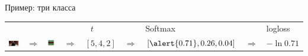 \documentclass[notes,12pt, aspectratio=169]{beamer}
\begin{document}
\begin{frame}{Пример: три класса}
\begin{tabular}{m{2.5cm} m{0.35cm} m{1.8cm} m{0.35cm} m{1cm} m{0.35cm} m{2.7cm} m{0.5cm} m{1.5cm}} 

& & & &  {\large  $\mbox{ }t$ } &  &  {\large \hspace{5pt} Softmax} &  &  {\large  logloss} \\
\includegraphics[scale=0.2]{tab_cat.png} & {\Large $\Rightarrow$} & \includegraphics[scale=0.2]{tab_nn.png}  &  {\Large $\Rightarrow$} &  $[5, 4, 2]$ &  {\Large $\Rightarrow$} &  $[\alert{0.71}, 0.26, 0.04]$ & {\Large $\Rightarrow$}  & $-\ln 0.71$\\


\end{tabular}
\end{frame}
\end{document}

